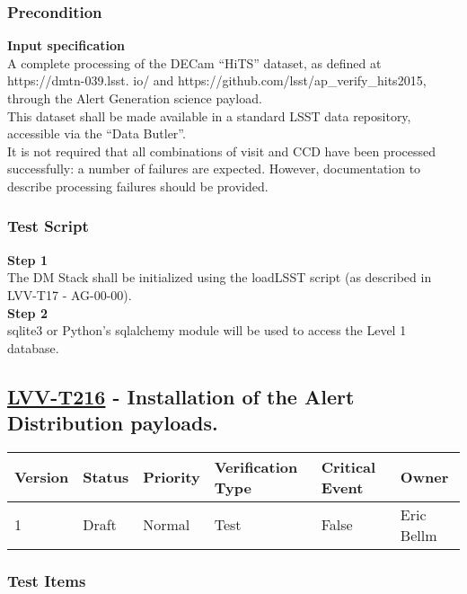 \subsubsection{Precondition}\label{precondition-5}

\textbf{Input specification}\\[2\baselineskip]A complete processing of
the DECam ``HiTS'' dataset, as defined at https://dmtn-039.lsst. io/ and
https://github.com/lsst/ap\_verify\_hits2015, through the Alert
Generation science payload.\\
This dataset shall be made available in a standard LSST data repository,
accessible via the ``Data Butler''.\\
It is not required that all combinations of visit and CCD have been
processed successfully: a number of failures are expected. However,
documentation to describe processing failures should be provided.

\subsubsection{Test Script}\label{test-script-5}

\textbf{Step 1}\\
The DM Stack shall be initialized using the loadLSST script (as
described in LVV-T17 - AG-00-00).\\[2\baselineskip]\textbf{Step 2}\\
sqlite3 or Python's sqlalchemy module will be used to access the Level 1
database.\\[2\baselineskip]

\subsection{\texorpdfstring{\href{https://jira.lsstcorp.org/secure/Tests.jspa\#/testCase/LVV-T216}{LVV-T216}
- Installation of the Alert Distribution
payloads.}{LVV-T216 - Installation of the Alert Distribution payloads.}}\label{lvv-t216---installation-of-the-alert-distribution-payloads.}

\begin{longtable}[]{@{}llllll@{}}
\toprule
Version & Status & Priority & Verification Type & Critical Event &
Owner\tabularnewline
\midrule
\endhead
1 & Draft & Normal & Test & False & Eric Bellm\tabularnewline
\bottomrule
\end{longtable}

\subsubsection{Test Items}\label{test-items-6}

